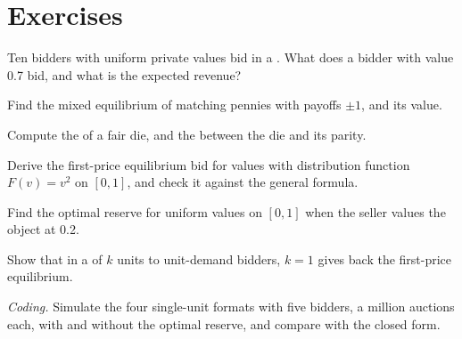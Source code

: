 \section{Exercises}

\begin{exercise}[$\star$]\label{exo:qm:games-auctions-and-information:1}
Ten bidders with uniform private values bid in a . What does a bidder with value 0.7 bid, and what is the expected revenue?
\end{exercise}

\begin{exercise}[$\star$]\label{exo:qm:games-auctions-and-information:2}
Find the mixed equilibrium of matching pennies with payoffs $\pm1$, and its value.
\end{exercise}

\begin{exercise}[$\star$]\label{exo:qm:games-auctions-and-information:3}
Compute the  of a fair die, and the  between the die and its parity.
\end{exercise}

\begin{exercise}[$\star\star$]\label{exo:qm:games-auctions-and-information:4}
Derive the first-price equilibrium bid for values with distribution function $F(v) = v^2$ on $[0, 1]$, and check it against the general formula.
\end{exercise}

\begin{exercise}[$\star\star$]\label{exo:qm:games-auctions-and-information:5}
Find the optimal reserve for uniform values on $[0, 1]$ when the seller values the object at 0.2.
\end{exercise}

\begin{exercise}[$\star\star$]\label{exo:qm:games-auctions-and-information:6}
Show that in a  of $k$ units to unit-demand bidders, $k = 1$ gives back the first-price equilibrium.
\end{exercise}

\begin{exercise}[$\star\star\star$]\label{exo:qm:games-auctions-and-information:7}
\emph{Coding.} Simulate the four single-unit formats with five bidders, a million auctions each, with and without the optimal reserve, and compare with the closed form.
\end{exercise}

